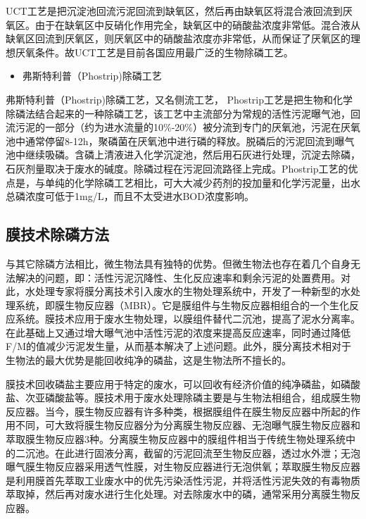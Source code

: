 \documentclass[
]{book}
\providecommand{\tightlist}{%
  \setlength{\itemsep}{0pt}\setlength{\parskip}{0pt}}
\begin{document}
UCT工艺是把沉淀池回流污泥回流到缺氧区，然后再由缺氧区将混合液回流到厌氧区。由于在缺氧区中反硝化作用完全，缺氧区中的硝酸盐浓度非常低。混合液从缺氧区回流到厌氧区，则厌氧区中的硝酸盐浓度亦非常低，从而保证了厌氧区的理想厌氧条件。故UCT工艺是目前各国应用最广泛的生物除磷工艺。

\begin{itemize}
\tightlist
\item
  弗斯特利普（Phostrip)除磷工艺
\end{itemize}

弗斯特利普（Phostrip)除磷工艺，又名侧流工艺， Phostrip工艺是把生物和化学除磷法结合起来的一种除磷工艺，该工艺中主流部分为常规的活性污泥曝气池，回流污泥的一部分（约为进水流量的10\%-20\%）被分流到专门的厌氧池，污泥在厌氧池中通常停留8-12h，聚磷菌在厌氧池中进行磷的释放。脱磷后的污泥回流到曝气池中继续吸磷。含磷上清液进入化学沉淀池，然后用石灰进行处理，沉淀去除磷，石灰剂量取决于废水的碱度。除磷过程在污泥回流路径上完成。Phostrip工艺的优点是，与单纯的化学除磷工艺相比，可大大减少药剂的投加量和化学污泥量，出水总磷浓度可低于1mg/L，而且不太受进水BOD浓度影响。

\hypertarget{ux819cux6280ux672fux9664ux78f7ux65b9ux6cd5}{%
\subsection{膜技术除磷方法}\label{ux819cux6280ux672fux9664ux78f7ux65b9ux6cd5}}

与其它除磷方法相比，微生物法具有独特的优势。但微生物法也存在着几个自身无法解决的问题，即：活性污泥沉降性、生化反应速率和剩余污泥的处置费用。对此，水处理专家将膜分离技术引入废水的生物处理系统中，开发了一种新型的水处理系统，即膜生物反应器（MBR）。它是膜组件与生物反应器相组合的一个生化反应系统。膜技术应用于废水生物处理，以膜组件替代二沉池，提高了泥水分离率。在此基础上又通过增大曝气池中活性污泥的浓度来提高反应速率，同时通过降低F/M的值减少污泥发生量，从而基本解决了上述问题。此外，膜分离技术相对于生物法的最大优势是能回收纯净的磷盐，这是生物法所不擅长的。

膜技术回收磷盐主要应用于特定的废水，可以回收有经济价值的纯净磷盐，如磷酸盐、次亚磷酸盐等。膜技术用于废水处理除磷主要是与生物法相组合，组成膜生物反应器。当今，膜生物反应器有许多种类，根据膜组件在膜生物反应器中所起的作用不同，可大致将膜生物反应器分为分离膜生物反应器、无泡曝气膜生物反应器和萃取膜生物反应器3种。分离膜生物反应器中的膜组件相当于传统生物处理系统中的二沉池。在此进行固液分离，截留的污泥回流至生物反应器，透过水外泄；无泡曝气膜生物反应器采用透气性膜，对生物反应器进行无泡供氧；萃取膜生物反应器是利用膜首先萃取工业废水中的优先污染活性污泥，并将活性污泥失效的有毒物质萃取掉，然后再对废水进行生化处理。对去除废水中的磷，通常采用分离膜生物反应器。
\end{document}
